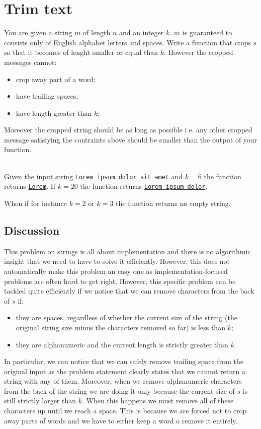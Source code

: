 \section{Trim text}
\begin{exercise}
You are given a string $m$ of length $n$ and an integer $k$. $m$ is guaranteed to consists only of English alphabet letters and spaces.
Write a function that crops $s$ so that it becomes of lenght smaller or equal than $k$. However the cropped messages cannot:
\begin{itemize}
    \item crop away part of a word;
    \item have trailing spaces;
    \item have length greater than $k$;
\end{itemize}
Moreover the cropped string should be as long as possible i.e. any other cropped message satisfying the contraints above should be smaller than the output of your function.

     
    \begin{example}
        \label{ex:trim_text:example1}
        \hfill \\
        Given the input string \underline{\texttt{Lorem ipsum dolor sit amet\textvisiblespace }} and $k=6$ the function returns \underline{\texttt{Lorem}}.
        If $k=20$ the function returns \underline{\texttt{Lorem ipsum dolor}}.
        
        When if for instance $k=2$ or $k=3$ the function returns an empty string.
    \end{example}
    
\end{exercise}
 

\subsection{Discussion}
This problem on strings is all about implementation and there is no algorithmic insight that we need to have to solve it efficiently. 
However, this does not automatically make this problem an easy one as implementation-focused problems are often hard to get right. 
However, this specific problem can be tackled quite efficiently if we notice that we can remove characters from the back of $s$ if:
\begin{itemize}
    \item they are spaces, regardless of whether the current size of the string (the original string size minus the characters removed so far) is less than $k$;
    \item they are alphanumeric and the current length is strictly greater than $k$.
\end{itemize}
In particular, we can notice that we can safely remove trailing space from the original input as the problem statement clearly states that we cannot return a string with any of them.
Moreover, when we remove alphanumeric characters from the back of the string we are doing it only because the current size of $s$ is still strictly larger than $k$. 
When this happens we must remove all of these characters up until we reach a space. This is because we are forced not to crop away parts of words and we have to either keep a word o remove it entirely.

